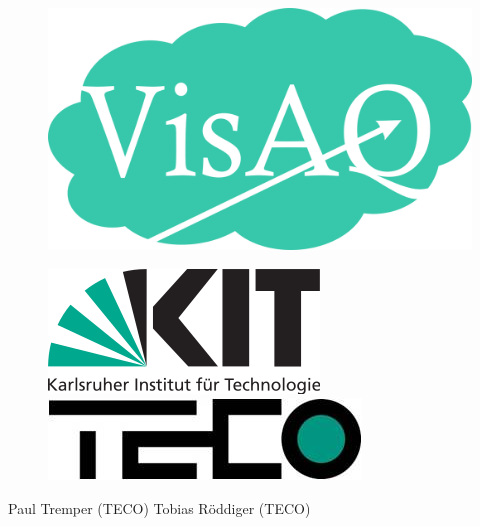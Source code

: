 \begin{titlepage}
    \maketitle
    \begin{tcolorbox}
        \centering
        {\Huge \textbf{\softwarename}}\\
        {\huge \longSoftwarename}\\
    \end{tcolorbox}
    \begin{figure}[h]
        \centering
        \includegraphics[scale=1] {media/logoHQ.png}
    \end{figure}
    \vfill
    \begin{figure}
        \centering
        \includegraphics[scale=0.35] {media/KIT_Logo.png}
        \hspace{3cm}
        \includegraphics[scale=1.2] {media/teco.jpg}
    \end{figure}
    \centering
    \vfill
    Paul Tremper (TECO)
    \hspace{1cm}
    Tobias Röddiger (TECO)
\end{titlepage}

\tableofcontents